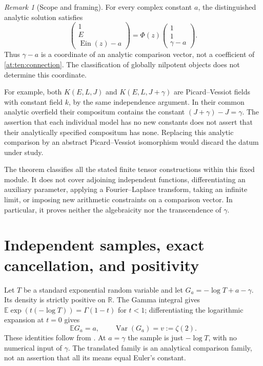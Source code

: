 \documentclass[11pt,a4paper]{article}
\newcommand{\R}{\mathbb R}
\newcommand{\Ein}{\operatorname{Ein}}
\newcommand{\E}{\mathbb E}
\newcommand{\Var}{\operatorname{Var}}
\theoremstyle{definition}
\theoremstyle{remark}
\newtheorem{remark}[theorem]{Remark}
\numberwithin{equation}{section}
\begin{document}
\begin{remark}[Scope and framing]\label{at:ten:framing}
For every complex constant $a$, the distinguished analytic solution
satisfies
\begin{equation}\label{at:ten:comparison}
 \begin{pmatrix}1\\E\\\Ein(z)-a\end{pmatrix}
 =\Phi(z)\begin{pmatrix}1\\1\\\gamma-a\end{pmatrix}.
\end{equation}
Thus $\gamma-a$ is a coordinate of an analytic comparison vector,
not a coefficient of \eqref{at:ten:connection}.  The classification of
globally nilpotent objects does not determine this coordinate.

For example, both $K(E,L,J)$ and $K(E,L,J+\gamma)$ are
Picard--Vessiot fields with constant field $k$, by the same
independence argument.  In their common analytic overfield their
compositum contains the constant $(J+\gamma)-J=\gamma$.
The assertion that each individual model has no new constants does
not assert that their analytically specified compositum has none.
Replacing this analytic comparison by an abstract
Picard--Vessiot isomorphism would discard the datum under study.

The theorem classifies all the stated finite tensor constructions
within this fixed module.  It does not cover adjoining independent
functions, differentiating an auxiliary parameter, applying a
Fourier--Laplace transform, taking an infinite limit, or imposing
new arithmetic constraints on a comparison vector.  In particular,
it proves neither the algebraicity nor the transcendence of
$\gamma$.
\end{remark}

\section{Independent samples, exact cancellation, and positivity}
\label{at:sec:statistics}

Let $T$ be a standard exponential random variable and let
$G_a=-\log T+a-\gamma$. Its density is strictly positive on $\R$.
The Gamma integral gives $\E\exp(t(-\log T))=\Gamma(1-t)$ for $t<1$;
differentiating the logarithmic expansion at $t=0$ gives
\begin{equation}
 \E G_a=a,\qquad\Var(G_a)=v:=\zeta(2).
\end{equation}
These identities follow from \cite[Sections 5.2 and 5.7]{at:DLMF}. At
$a=\gamma$ the sample is just $-\log T$, with no numerical input of
$\gamma$. The translated family is an analytical comparison family,
not an assertion that all its means equal Euler's constant.
\end{document}
